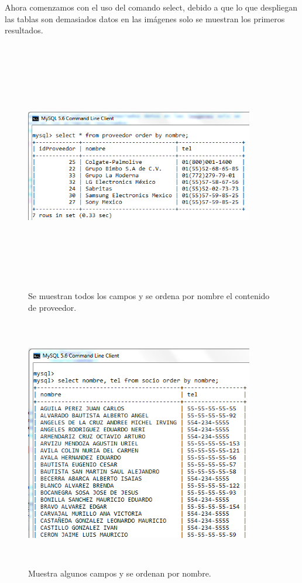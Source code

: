 \documentclass[12pt, titlepage]{article}
\begin{document}
    Ahora comenzamos con el uso del comando select, debido a que lo que despliegan las tablas son demasiados datos en las imágenes solo se muestran los primeros resultados.
    \begin{figure}[H]
        \begin{center}
            \includegraphics[width=10cm, height=11cm]{img/campos.png}
            \caption{Se muestran todos los campos y se ordena por nombre el contenido de proveedor.}
            \label{fig:arlter}
        \end{center}
    \end{figure}
\begin{figure}[H]
    \begin{center}
        \includegraphics[width=10cm, height=11cm]{img/order.png}
        \caption{Muestra algunos campos y se ordenan por nombre.}
        \label{fig:arlter2}
    \end{center}
\end{figure}
\end{document}

